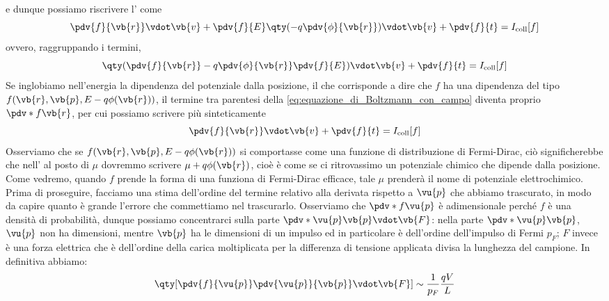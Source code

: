 e dunque possiamo riscrivere l' come
\begin{equation*}
    \pdv{f}{\vb{r}} \vdot \vb{v} + \pdv{f}{E} \qty( -q \pdv{\phi}{\vb{r}} ) \vdot \vb{v} + \pdv{f}{t}
    =I_{\rm coll}[f]
\end{equation*}
ovvero, raggruppando i termini,
\begin{equation}
    \qty( \pdv{f}{\vb{r}} - q \pdv{\phi}{\vb{r}} \pdv{f}{E} ) \vdot \vb{v} + \pdv{f}{t}
    =I_{\rm coll}[f]
    \label{eq:equazione_di_Boltzmann_con_campo}
\end{equation}
Se inglobiamo nell'energia la dipendenza del potenziale dalla posizione, il che corrisponde a dire che $f$ ha una dipendenza del tipo $f(\vb{r},\vb{p}, E - q \phi(\vb{r}))$, il termine tra parentesi della \eqref{eq:equazione_di_Boltzmann_con_campo} diventa proprio $\pdv*{f}{\vb{r}}$, per cui possiamo scrivere più sinteticamente
\begin{equation}
    \pdv{f}{\vb{r}} \vdot \vb{v} + \pdv{f}{t}
    =I_{\rm coll}[f]
    \label{eq:equazione_di_Boltzmann_con_campo_sintetica}
\end{equation}
Osserviamo che se $f(\vb{r},\vb{p}, E - q \phi(\vb{r}))$ si comportasse come una funzione di distribuzione di Fermi-Dirac, ciò significherebbe che nell' al posto di $\mu$ dovremmo scrivere $\mu + q\phi(\vb{r})$, cioè è come se ci ritrovassimo un potenziale chimico che dipende dalla posizione. Come vedremo, quando $f$ prende la forma di una funziona di Fermi-Dirac efficace, tale $\mu$ prenderà il nome di potenziale elettrochimico.\\
Prima di proseguire, facciamo una stima dell'ordine del termine relativo alla derivata rispetto a $\vu{p}$ che abbiamo trascurato, in modo da capire quanto è grande l'errore che commettiamo nel trascurarlo. Osserviamo che $\pdv*{f}{\vu{p}}$ è adimensionale perché $f$ è una densità di probabilità, dunque possiamo concentrarci sulla parte $\pdv*{\vu{p}}{\vb{p}} \vdot \vb{F}$: nella parte $\pdv*{\vu{p}}{\vb{p}}$, $\vu{p}$ non ha dimensioni, mentre $\vb{p}$ ha le dimensioni di un impulso ed in particolare è dell'ordine dell'impulso di Fermi $p_F$; $F$ invece è una forza elettrica che è dell'ordine della carica moltiplicata per la differenza di tensione applicata divisa la lunghezza del campione. In definitiva abbiamo:
\begin{equation*}
    \qty[ \pdv{f}{\vu{p}} \pdv{\vu{p}}{\vb{p}} \vdot \vb{F} ]
    \sim \frac{1}{p_F} \frac{qV}{L}
\end{equation*}
